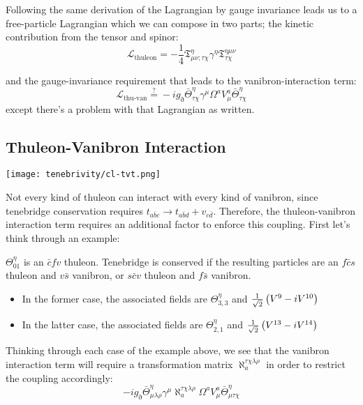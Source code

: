 Following the same derivation of the Lagrangian by gauge invariance leads us to a free-particle Lagrangian which we can compose in two parts; the kinetic contribution from the tensor and spinor:
\[
  \mathcal{L}_{\text{thuleon}} = -\frac{1}{4}\mathfrak{T}^{\eta}_{\mu \nu ; \tau \chi}\gamma^{\eta} \mathfrak{T}^{\eta \mu \nu}_{ \tau \chi}
\]

and the gauge-invariance requirement that leads to the vanibron-interaction term:
\[
  \mathcal{L}_{\text{thu-van}} \overset{?}{=} - i g_{\eth} \bar{\Theta}^{\eta}_{\tau \chi} \gamma^{\mu}  \Omega^a V^a_{\mu}  \bar{\Theta}^{\eta}_{\tau \chi}
\]
except there's a problem with that Lagrangian as written.

\subsection{Thuleon-Vanibron Interaction}
\begin{center}
  \texttt{[image: tenebrivity/cl-tvt.png]}
\end{center}
Not every kind of thuleon can interact with every kind of vanibron, since tenebridge conservation requires \(t_{a\bar{b}c} \rightarrow t_{a\bar{b}d} + v_{c\bar{d}} \). Therefore, the thuleon-vanibron interaction term requires an additional factor to enforce this coupling. First let's think through an example:
\begin{example}
  \(\Theta^{\eta}_{01}\) is an \(\bar{c}fv\) thuleon. Tenebridge is conserved if the resulting particles are an \(f\bar{c}s\) thuleon and \(v\bar{s}\) vanibron, or \(s\bar{c}v\) thuleon and \(f\bar{s}\) vanibron.
  \begin{itemize}
    \item In the former case, the associated fields are \(\Theta^{\eta}_{3,3}\) and \(\frac{1}{\sqrt{2}}\left(V^9 - i V^{10}\right)\)
    \item In the latter case, the associated fields are \(\Theta^{\eta}_{2,1}\) and \(\frac{1}{\sqrt{2}}\left(V^{13} - i V^{14}\right)\)
  \end{itemize}
\end{example}

\newcommand{\tvtmat}{\ensuremath{\aleph_a^{\tau \chi \lambda \rho}}}

Thinking through each case of the example above, we see that the vanibron interaction term will require a transformation matrix \(\tvtmat\) in order to restrict the coupling accordingly:
\[
  - i g_{\eth}
  \bar{\Theta}^{\eta}_{\mu \lambda \rho}
  \gamma^{\mu}
  \tvtmat
  \Omega^a
  V^a_{\mu}
  \bar{\Theta}^{\eta}_{\mu \tau \chi}
\]



